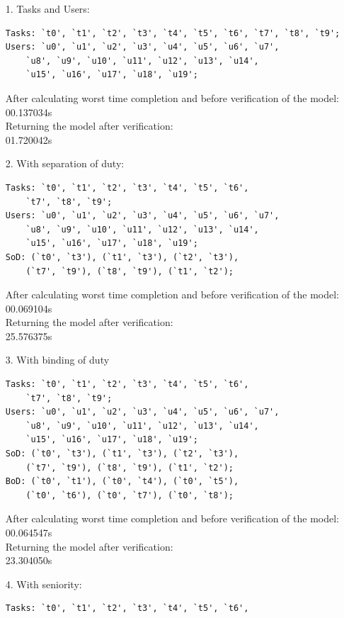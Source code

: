 \documentclass[a4paper]{report}
\begin{document}
\begin{enumerate}
\item[1.] Tasks and Users:
\begin{lstlisting}[frame=single]
Tasks: `t0', `t1', `t2', `t3', `t4', `t5', `t6', `t7', `t8', `t9';
Users: `u0', `u1', `u2', `u3', `u4', `u5', `u6', `u7', 
	`u8', `u9', `u10', `u11', `u12', `u13', `u14', 
	`u15', `u16', `u17', `u18', `u19'; 
\end{lstlisting}
After calculating worst time completion and before verification of the model:\\
00.137034s\\
Returning the model after verification: \\
01.720042s
\item[2.] With separation of duty:
\begin{lstlisting}[frame=single]
Tasks: `t0', `t1', `t2', `t3', `t4', `t5', `t6', 
	`t7', `t8', `t9';
Users: `u0', `u1', `u2', `u3', `u4', `u5', `u6', `u7', 
	`u8', `u9', `u10', `u11', `u12', `u13', `u14', 
	`u15', `u16', `u17', `u18', `u19'; 
SoD: (`t0', `t3'), (`t1', `t3'), (`t2', `t3'), 
	(`t7', `t9'), (`t8', `t9'), (`t1', `t2');
\end{lstlisting}
After calculating worst time completion and before verification of the model:\\
00.069104s\\
Returning the model after verification: \\
25.576375s\\
\item[3.] With binding of duty
\begin{lstlisting}[frame=single]
Tasks: `t0', `t1', `t2', `t3', `t4', `t5', `t6', 
	`t7', `t8', `t9';
Users: `u0', `u1', `u2', `u3', `u4', `u5', `u6', `u7', 
	`u8', `u9', `u10', `u11', `u12', `u13', `u14', 
	`u15', `u16', `u17', `u18', `u19'; 
SoD: (`t0', `t3'), (`t1', `t3'), (`t2', `t3'), 
	(`t7', `t9'), (`t8', `t9'), (`t1', `t2');
BoD: (`t0', `t1'), (`t0', `t4'), (`t0', `t5'), 
	(`t0', `t6'), (`t0', `t7'), (`t0', `t8');
\end{lstlisting}
After calculating worst time completion and before verification of the model:\\
00.064547s\\
Returning the model after verification: \\
23.304050s\\
\item[4.] With seniority:
\begin{lstlisting}[frame=single]
Tasks: `t0', `t1', `t2', `t3', `t4', `t5', `t6', 

\end{lstlisting}
\end{enumerate}
\end{document}
